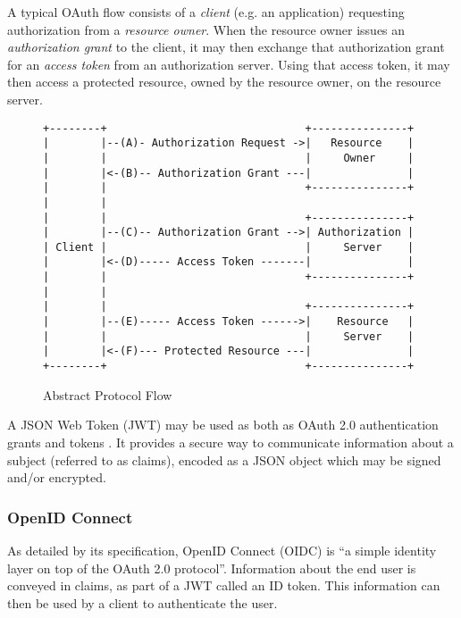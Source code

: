 A typical OAuth flow consists of a \emph{client} (e.g. an application) requesting authorization from a \emph{resource owner}. When the resource owner issues an \emph{authorization grant} to the client, it may then exchange that authorization grant for an \emph{access token} from an authorization server. Using that access token, it may then access a protected resource, owned by the resource owner, on the resource server. \autocite{Hardt2023}
\begin{figure}[h]
\begin{scriptsize}
\begin{verbatim} 
+--------+                               +---------------+
|        |--(A)- Authorization Request ->|   Resource    |
|        |                               |     Owner     |
|        |<-(B)-- Authorization Grant ---|               |
|        |                               +---------------+
|        |
|        |                               +---------------+
|        |--(C)-- Authorization Grant -->| Authorization |
| Client |                               |     Server    |
|        |<-(D)----- Access Token -------|               |
|        |                               +---------------+
|        |
|        |                               +---------------+
|        |--(E)----- Access Token ------>|    Resource   |
|        |                               |     Server    |
|        |<-(F)--- Protected Resource ---|               |
+--------+                               +---------------+
\end{verbatim}
\end{scriptsize}
\caption{Abstract Protocol Flow \autocite{Hardt2023}}
\end{figure}

A JSON Web Token (JWT) may be used as both as OAuth 2.0 authentication grants and tokens \autocite{Jones2015a, Bertocci2021}. It provides a secure way to communicate information about a subject (referred to as claims), encoded as a JSON object which may be signed and/or encrypted. \autocite{Jones2015}

\subsubsection{OpenID Connect}
As detailed by its specification, OpenID Connect (OIDC) is ``a simple identity layer on top of the OAuth 2.0 protocol''. Information about the end user is conveyed in claims, as part of a JWT called an ID token. This information can then be used by a client to authenticate the user. \autocite{Sakimura2014} 


